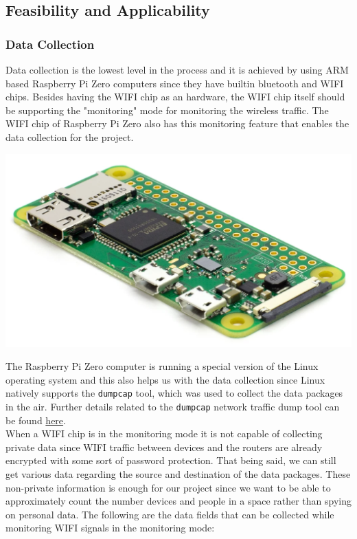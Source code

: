 \documentclass[journal, 12pt]{IEEEtran}
\begin{document}
\subsection{Feasibility and Applicability}
\subsubsection{Data Collection} Data collection is the lowest level in the process and it is achieved by using ARM based Raspberry Pi Zero computers since they have builtin bluetooth and WIFI chips. Besides having the WIFI chip as an hardware, the WIFI chip itself should be supporting the "monitoring" mode for monitoring the wireless traffic. The WIFI chip of Raspberry Pi Zero also has this monitoring feature that enables the data collection for the project.

\begingroup
    \center
    \medskip
    \includegraphics[width=0.6\columnwidth]{report/interim_report/images/raspi.png}
    \label{fig:raspi}
    \medskip
\endgroup

\noindent The  Raspberry Pi Zero computer is running a special version of the Linux operating system and this also helps us with the data collection since Linux natively supports the \texttt{dumpcap} tool, which was used to collect the data packages in the air. Further details related to the \texttt{dumpcap} network traffic dump tool can be found  \href{https://linux.die.net/man/1/dumpcap}{here}.\\

\noindent When a WIFI chip is in the monitoring mode it is not capable of collecting private data since WIFI traffic between devices and the routers are already encrypted with some sort of password protection. That being said, we can still get various data regarding the source and destination of the data packages. These non-private information is enough for our project since we want to be able to approximately count the number devices and people in a space rather than spying on personal data. The following are the data fields that can be collected while monitoring WIFI signals in the monitoring mode:
\end{document}
